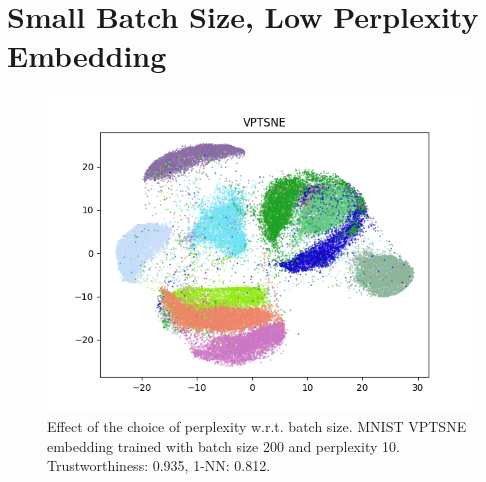 \chapter{Small Batch Size, Low Perplexity Embedding}
\label{appendix:low_perp_small_bs}
\begin{figure}[!htb]
  \centering
  \includegraphics[width=\textwidth]{images/mnist_vptsne_bs_200_perp_10.png} 
  \caption{Effect of the choice of perplexity w.r.t. batch size. MNIST VPTSNE embedding trained with batch size 200 and perplexity 10. Trustworthiness: 0.935, 1-NN: 0.812.}
  \label{fig:low_perp_small_bs}
\end{figure}

